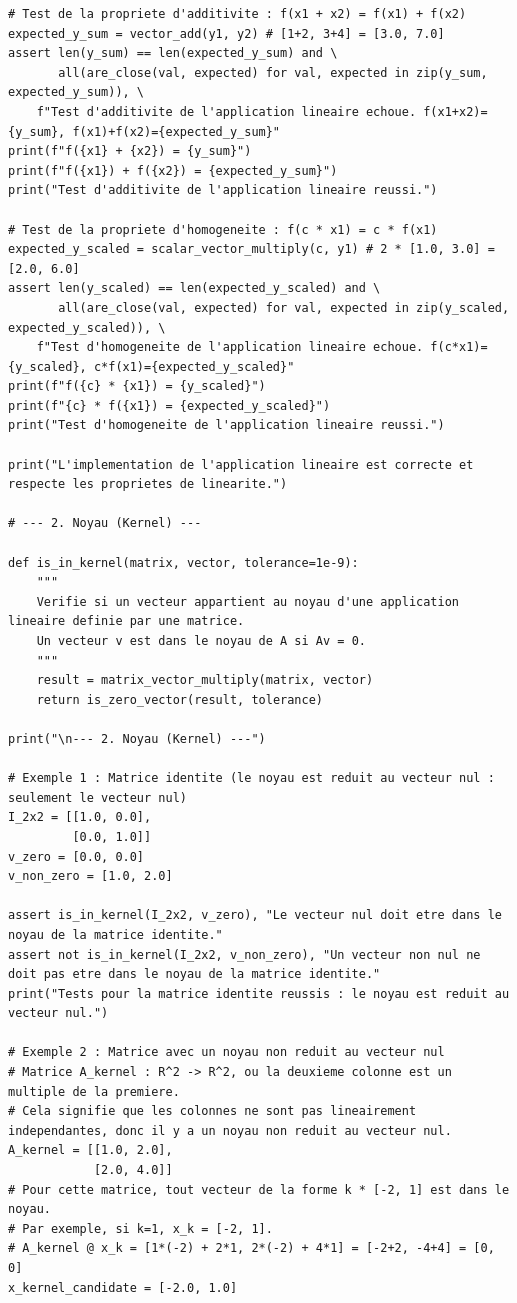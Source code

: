 \documentclass{report}
\begin{document}
\begin{verbatim}
# Test de la propriete d'additivite : f(x1 + x2) = f(x1) + f(x2)
expected_y_sum = vector_add(y1, y2) # [1+2, 3+4] = [3.0, 7.0]
assert len(y_sum) == len(expected_y_sum) and \
       all(are_close(val, expected) for val, expected in zip(y_sum, expected_y_sum)), \
    f"Test d'additivite de l'application lineaire echoue. f(x1+x2)={y_sum}, f(x1)+f(x2)={expected_y_sum}"
print(f"f({x1} + {x2}) = {y_sum}")
print(f"f({x1}) + f({x2}) = {expected_y_sum}")
print("Test d'additivite de l'application lineaire reussi.")

# Test de la propriete d'homogeneite : f(c * x1) = c * f(x1)
expected_y_scaled = scalar_vector_multiply(c, y1) # 2 * [1.0, 3.0] = [2.0, 6.0]
assert len(y_scaled) == len(expected_y_scaled) and \
       all(are_close(val, expected) for val, expected in zip(y_scaled, expected_y_scaled)), \
    f"Test d'homogeneite de l'application lineaire echoue. f(c*x1)={y_scaled}, c*f(x1)={expected_y_scaled}"
print(f"f({c} * {x1}) = {y_scaled}")
print(f"{c} * f({x1}) = {expected_y_scaled}")
print("Test d'homogeneite de l'application lineaire reussi.")

print("L'implementation de l'application lineaire est correcte et respecte les proprietes de linearite.")

# --- 2. Noyau (Kernel) ---

def is_in_kernel(matrix, vector, tolerance=1e-9):
    """
    Verifie si un vecteur appartient au noyau d'une application lineaire definie par une matrice.
    Un vecteur v est dans le noyau de A si Av = 0.
    """
    result = matrix_vector_multiply(matrix, vector)
    return is_zero_vector(result, tolerance)

print("\n--- 2. Noyau (Kernel) ---")

# Exemple 1 : Matrice identite (le noyau est reduit au vecteur nul : seulement le vecteur nul)
I_2x2 = [[1.0, 0.0],
         [0.0, 1.0]]
v_zero = [0.0, 0.0]
v_non_zero = [1.0, 2.0]

assert is_in_kernel(I_2x2, v_zero), "Le vecteur nul doit etre dans le noyau de la matrice identite."
assert not is_in_kernel(I_2x2, v_non_zero), "Un vecteur non nul ne doit pas etre dans le noyau de la matrice identite."
print("Tests pour la matrice identite reussis : le noyau est reduit au vecteur nul.")

# Exemple 2 : Matrice avec un noyau non reduit au vecteur nul
# Matrice A_kernel : R^2 -> R^2, ou la deuxieme colonne est un multiple de la premiere.
# Cela signifie que les colonnes ne sont pas lineairement independantes, donc il y a un noyau non reduit au vecteur nul.
A_kernel = [[1.0, 2.0],
            [2.0, 4.0]]
# Pour cette matrice, tout vecteur de la forme k * [-2, 1] est dans le noyau.
# Par exemple, si k=1, x_k = [-2, 1].
# A_kernel @ x_k = [1*(-2) + 2*1, 2*(-2) + 4*1] = [-2+2, -4+4] = [0, 0]
x_kernel_candidate = [-2.0, 1.0]


\end{verbatim}
\end{document}
